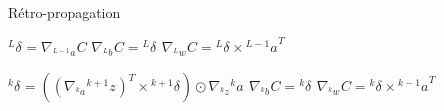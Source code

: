 \documentclass[11pt]{beamer}
\newcommand{\lexp}[1]{\phantom{}^{#1}}
\newcommand{\elem}[4]{\lexp{#2}#1^{#3}_{#4}}
\begin{document}
\begin{frame}{Rétro-propagation}
	\begin{algorithm}[H]
		\caption{Algorithme de Rétro-propagation}
		\begin{algorithmic}
		    \STATE $\elem{\delta}{L}{}{} = \nabla_{\elem{a}{L-1}{}{}} C$
		    \STATE $\nabla_{\elem{b}{L}{}{}} C = \elem{\delta}{L}{}{}$
		    \STATE $\nabla_{\elem{w}{L}{}{}} C = \elem{\delta}{L}{}{} \times{\elem{a}{L-1}{}{}}^T $
		    
		    	\STATE $\elem{\delta}{k}{}{} = ((\nabla_{\elem{a}{k}{}{}}\elem{z}{k+1}{}{})^T \times \elem{\delta}{k+1}{}{}) \odot \nabla_{\elem{z}{k}{}{}}{\elem{a}{k}{}{}}$
		    	\STATE $\nabla_{\elem{b}{k}{}{}} C = \elem{\delta}{k}{}{}$
		    	\STATE $\nabla_{\elem{w}{k}{}{}} C = \elem{\delta}{k}{}{} \times{\elem{a}{k-1}{}{}}^T $
		    \ENDFOR
		\end{algorithmic}
	\end{algorithm}
\end{frame}
\end{document}
